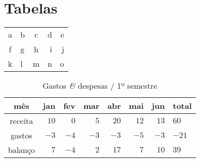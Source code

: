 \section{Tabelas}\label{sec:tabelas}

\begin{center}
\begin{tabular}{clcr|r|}
  a & b & c & d & e\\
  f & g & h & i & j\\
  \hline
  k & l & m & n & o
\end{tabular}
\end{center}


\begin{table}\centering
  \caption{Gastos {\it \&} despesas / 1º semestre}

  \begin{tabular}{crrrrrrl}
    mês & jan & fev & mar & abr & mai & jun & total\\
    \hline
  receita & $10$ & $0$ & $5$ & $20$ & $12$ & $13$ & $60$\\
  gastos  & $-3$ & $-4$ & $-3$ & $-3$ & $-5$ & $-3$ & $-21$ \\
  \hline
  balanço & $7$ & $-4$ & $2$ & $17$ & $7$ & $10$ & $39$\\
  \end{tabular}
\end{table}
